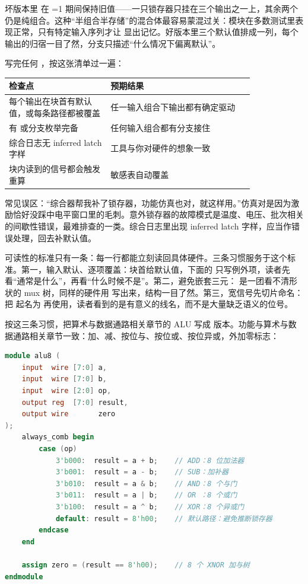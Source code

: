 坏版本里  在 =1 期间保持旧值——一只锁存器只挂在三个输出之一上，其余两个仍是纯组合。这种“半组合半存储”的混合体最容易蒙混过关：模块在多数测试里表现正常，只有特定输入序列才让  显出记忆。好版本里三个默认值排成一列，每个输出的归宿一目了然，分支只描述“什么情况下偏离默认”。

写完任何 ，按这张清单过一遍：

\begin{longtable}{L{0.34\linewidth}L{0.48\linewidth}}
\toprule
检查点 & 预期结果 \\
\midrule
每个输出在块首有默认值，或每条路径都被覆盖 & 任一输入组合下输出都有确定驱动 \\\tablerowrule
{} 有  或分支枚举完备 & 任何输入组合都有分支接住 \\\tablerowrule
综合日志无 inferred latch 字样 & 工具与你对硬件的想象一致 \\\tablerowrule
块内读到的信号都会触发重算 &  敏感表自动覆盖 \\
\bottomrule
\end{longtable}

\begin{warningbox}
常见误区：“综合器帮我补了锁存器，功能仿真也对，就这样用。”仿真对是因为激励恰好没踩中电平窗口里的毛刺。意外锁存器的故障模式是温度、电压、批次相关的间歇性错误，最难排查的一类。综合日志里出现 inferred latch 字样，应当作错误处理，回去补默认值。
\end{warningbox}

可读性的标准只有一条：每一行都能立刻读回具体硬件。三条习惯服务于这个标准。第一，输入默认、逐项覆盖：块首给默认值，下面的  只写例外项，读者先看“通常是什么”，再看“什么时候不是”。第二，避免嵌套三元： 是一团看不清形状的 mux 树，同样的硬件用  写出来，结构一目了然。第三，宽信号先切片命名：把  起名为  再使用，读者看到的是有意义的线名，而不是大量缺乏语义的位号。

按这三条习惯，把算术与数据通路相关章节的 ALU 写成  版本。功能与算术与数据通路相关章节一致：加、减、按位与、按位或、按位异或，外加零标志：

\begin{lstlisting}[language=Verilog]
module alu8 (
    input  wire [7:0] a,
    input  wire [7:0] b,
    input  wire [2:0] op,
    output reg  [7:0] result,
    output wire       zero
);
    always_comb begin
        case (op)
            3'b000:  result = a + b;    // ADD：8 位加法器
            3'b001:  result = a - b;    // SUB：加补器
            3'b010:  result = a & b;    // AND：8 个与门
            3'b011:  result = a | b;    // OR ：8 个或门
            3'b100:  result = a ^ b;    // XOR：8 个异或门
            default: result = 8'h00;    // 默认路径：避免推断锁存器
        endcase
    end

    assign zero = (result == 8'h00);    // 8 个 XNOR 加与树
endmodule
\end{lstlisting}

